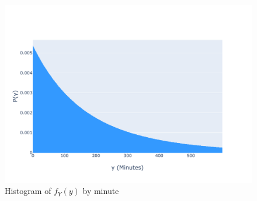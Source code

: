 \begin{figure}[h]
\centering
\includegraphics[width=17cm]{pics/1c4.pdf}
\caption{Histogram of $f_Y(y)$ by minute}
\label{fig:1c4}
\end{figure}
\FloatBarrier

